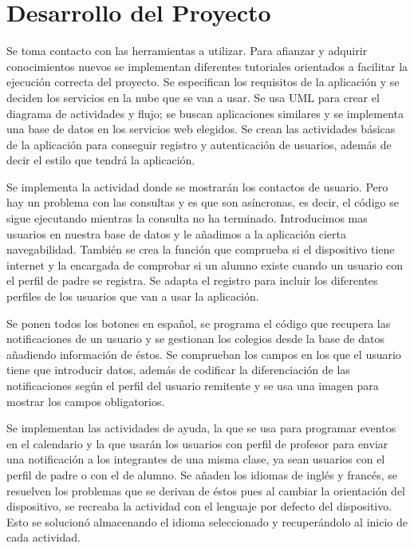 %
%
%
%

\cleardoublepage
\chapter{Desarrollo del Proyecto}
\label{chap:developing}

	Se toma contacto con las herramientas a utilizar. Para afianzar y adquirir conocimientos nuevos se implementan diferentes tutoriales orientados a facilitar la ejecución correcta del proyecto. Se especifican los requisitos de la aplicación y se deciden los servicios en la nube que se van a usar.
	Se usa UML\cite{58:UML:online} para crear el diagrama de actividades y flujo; se buscan aplicaciones similares y se implementa una base de datos en los servicios web elegidos. Se crean las actividades básicas de la aplicación para conseguir registro y autenticación de usuarios, además de decir el estilo que tendrá la aplicación.
	
	\bigskip
	Se implementa la actividad donde se mostrarán los contactos de usuario. Pero hay un problema con las consultas y es que son asíncronas, es decir, el código se sigue ejecutando mientras la consulta no ha terminado.
	Introducimos mas usuarios en nuestra base de datos y le añadimos a la aplicación cierta navegabilidad. También se crea la función que comprueba si el dispositivo tiene internet y la encargada de comprobar si un alumno existe cuando un usuario con el perfil de padre se registra. Se adapta el registro para incluir los diferentes perfiles de los usuarios que van a usar la aplicación.
	
	\bigskip
	Se ponen todos los botones en español, se programa el código que recupera las notificaciones de un usuario y se gestionan los colegios desde la base de datos añadiendo información de éstos. Se comprueban los campos en los que el usuario tiene que introducir datos, además de codificar la diferenciación de las notificaciones según el perfil del usuario remitente y se usa una imagen para mostrar los campos obligatorios.
	
	\bigskip
	Se implementan las actividades de ayuda, la que se usa para programar eventos en el calendario y la que usarán los usuarios con perfil de profesor para enviar una notificación a los integrantes de una misma clase, ya sean usuarios con el perfil de padre o con el de alumno. Se añaden los idiomas de inglés y francés, se resuelven los problemas que se derivan de éstos pues al cambiar la orientación del dispositivo,  se recreaba la actividad con el lenguaje por defecto del dispositivo. Esto se solucionó almacenando el idioma seleccionado y recuperándolo al inicio de cada actividad.
	
